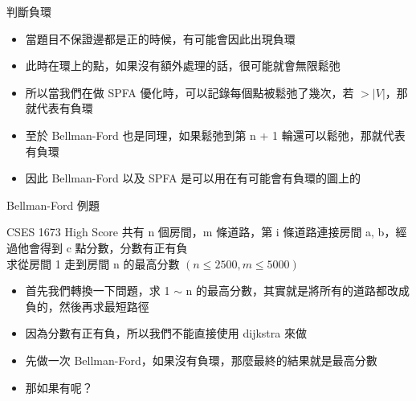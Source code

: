 \documentclass[aspectratio=169]{beamer}
\begin{document}
    \begin{frame}{判斷負環}
        \begin{itemize}
            \item<1-> 當題目不保證邊都是正的時候，有可能會因此出現負環
            \item<2-> 此時在環上的點，如果沒有額外處理的話，很可能就會無限鬆弛
            \item<3-> 所以當我們在做 SPFA 優化時，可以記錄每個點被鬆弛了幾次，若 $> \lvert V \rvert$，那就代表有負環
            \item<4-> 至於 Bellman-Ford 也是同理，如果鬆弛到第 n + 1 輪還可以鬆弛，那就代表有負環
            \item<5-> 因此 Bellman-Ford 以及 SPFA 是可以用在有可能會有負環的圖上的
        \end{itemize}
    \end{frame}

    \begin{frame}{Bellman-Ford 例題}
        \begin{block}{CSES 1673 High Score}
            共有 n 個房間，m 條道路，第 i 條道路連接房間 a, b，經過他會得到 c 點分數，分數有正有負\\
            求從房間 1 走到房間 n 的最高分數 $(n \le 2500, m \le 5000)$
        \end{block}

        \begin{itemize}
            \item<2-> 首先我們轉換一下問題，求 1 $\sim$ n 的最高分數，其實就是將所有的道路都改成負的，然後再求最短路徑
            \item<3-> 因為分數有正有負，所以我們不能直接使用 dijkstra 來做
            \item<4-> 先做一次 Bellman-Ford，如果沒有負環，那麼最終的結果就是最高分數
            \item<5-> 那如果有呢？
        \end{itemize}
    \end{frame}
\end{document}

